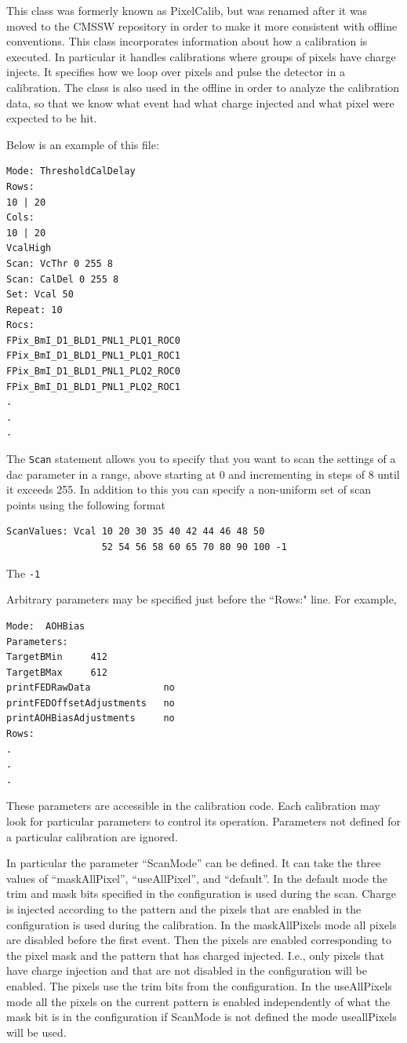 This class was formerly known as PixelCalib, but was renamed after
it was moved to the CMSSW repository in order to make it more
consistent with offline conventions.
This class incorporates information about how a calibration
is executed. In particular it handles calibrations where 
groups of pixels have charge injects. It specifies how we loop over pixels
and pulse the detector in a calibration. The class is also
used in the offline in order to analyze the calibration data,
so that we know what event had what charge injected and what
pixel were expected to be hit. 

Below is an example of this file:
\begin{verbatim}
Mode: ThresholdCalDelay
Rows:
10 | 20 
Cols:
10 | 20
VcalHigh
Scan: VcThr 0 255 8
Scan: CalDel 0 255 8
Set: Vcal 50
Repeat: 10
Rocs:
FPix_BmI_D1_BLD1_PNL1_PLQ1_ROC0
FPix_BmI_D1_BLD1_PNL1_PLQ1_ROC1
FPix_BmI_D1_BLD1_PNL1_PLQ2_ROC0
FPix_BmI_D1_BLD1_PNL1_PLQ2_ROC1
.
.
.
\end{verbatim}

The {\tt Scan} statement allows you to specify that
you want to scan the settings of a dac parameter in a 
range, above starting at 0 and incrementing in steps of
8 until it exceeds 255. In addition to this you can
specify a non-uniform set of scan points using the
following format
\begin{verbatim}
ScanValues: Vcal 10 20 30 35 40 42 44 46 48 50 
                 52 54 56 58 60 65 70 80 90 100 -1
\end{verbatim}
The {\tt -1} 

Arbitrary parameters may be specified just before the ``Rows:" line.
For example,
\begin{verbatim}
Mode:  AOHBias
Parameters:
TargetBMin     412
TargetBMax     612
printFEDRawData             no
printFEDOffsetAdjustments   no
printAOHBiasAdjustments     no
Rows:
.
.
.
\end{verbatim}
These parameters are accessible in the calibration code.  Each calibration
may look for particular parameters to control its operation.  Parameters
not defined for a particular calibration are ignored.

In particular the parameter ``ScanMode'' can be defined. It can take
the three values of ``maskAllPixel'', ``useAllPixel'', and ``default''.
In the default mode the trim and mask bits specified in the configuration 
is used during the scan. Charge is injected according to the pattern
and the pixels that are enabled in the configuration is used during
the calibration. In the maskAllPixels mode all pixels are
disabled before the first event. Then the pixels are enabled
corresponding to the pixel mask and the pattern that has charged
injected. I.e., only pixels that have charge injection and that
are not disabled in the configuration will be enabled. The pixels
use the trim bits from the configuration. In the useAllPixels mode
all the pixels on the current pattern is enabled independently of
what the mask bit is in the configuration if ScanMode is not 
defined the mode useallPixels will be used.

